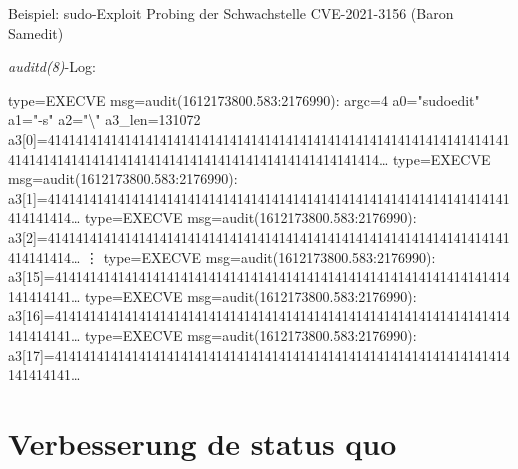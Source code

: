 \documentclass[xcolor={dvipsnames},aspectratio=169]{beamer}
\begin{document}
\begin{frame}[fragile]{Beispiel: sudo-Exploit}
Probing der Schwachstelle CVE-2021-3156 (Baron Samedit)
{\tiny
{}
}
\emph{auditd(8)}-Log:
\tiny
\begin{semiverbatim}
type=EXECVE msg=audit(1612173800.583:2176990): argc=4 a0="{}{\color{red}sudoedit}" a1="{}{\color{orange}-s}" a2="{}{\color{orange}\textbackslash}" a3\_len={\color{blue}131072}
   a3{\color{purple}[0]}=41414141414141414141414141414141414141414141414141414141414141414141414141414141414141414141414141414141414141414141414\dots
type=EXECVE msg=audit(1612173800.583:2176990): a3{\color{purple}[1]}=414141414141414141414141414141414141414141414141414141414141414141414141414\dots
type=EXECVE msg=audit(1612173800.583:2176990): a3{\color{purple}[2]}=414141414141414141414141414141414141414141414141414141414141414141414141414\dots
\vdots
type=EXECVE msg=audit(1612173800.583:2176990): a3{\color{purple}[15]}=41414141414141414141414141414141414141414141414141414141414141414141414141\dots
type=EXECVE msg=audit(1612173800.583:2176990): a3{\color{purple}[16]}=41414141414141414141414141414141414141414141414141414141414141414141414141\dots
type=EXECVE msg=audit(1612173800.583:2176990): a3{\color{purple}[17]}=41414141414141414141414141414141414141414141414141414141414141414141414141\dots
\end{semiverbatim}
\end{frame}

\section{Verbesserung de status quo}
\end{document}
